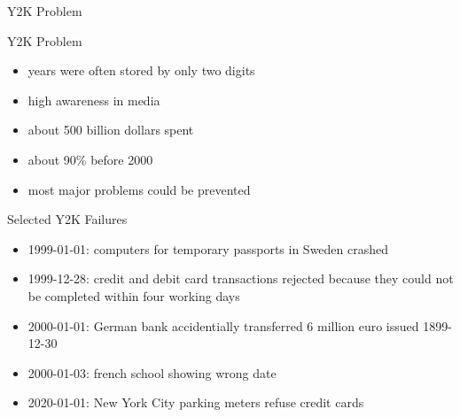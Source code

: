 \begin{frame}{Y2K Problem }
	\begin{fancycolumns}[b]
		\begin{definition}{Y2K Problem}
			\begin{itemize}
				\item years were often stored by only two digits
				\item high awareness in media
				\item about 500 billion dollars spent
				\item about 90\% before 2000
				\item most major problems could be prevented
			\end{itemize}
		\end{definition}
		\centering{}
	\nextcolumn
		\vspace{-15mm}
		
		\centering{}
		\begin{example}{Selected Y2K Failures}
			\begin{itemize}
				\item 1999-01-01: computers for temporary passports in Sweden crashed
				\item 1999-12-28: credit and debit card transactions rejected because they could not be completed within four working days
				\item 2000-01-01: German bank accidentially transferred 6 million euro issued 1899-12-30
				\item 2000-01-03: french school showing wrong date
				\item 2020-01-01: New York City parking meters refuse credit cards
			\end{itemize}
		\end{example}
	\end{fancycolumns}
\end{frame}

